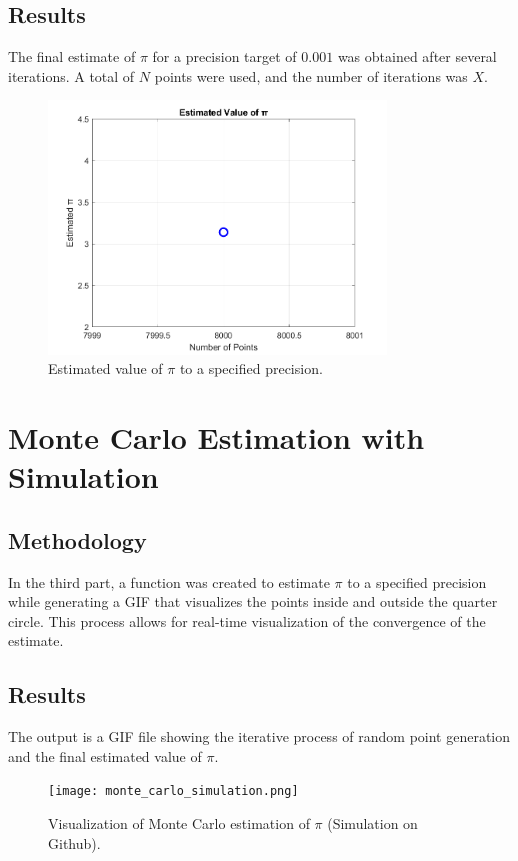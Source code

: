 \documentclass{article}
\begin{document}
\subsection{Results}
The final estimate of $\pi$ for a precision target of $0.001$ was obtained after several iterations. A total of $N$ points were used, and the number of iterations was $X$.

\begin{figure}[h!]
    \centering
    \includegraphics[width=0.8\textwidth]{pi_estimation_precision_plot.png}
    \caption{Estimated value of $\pi$ to a specified precision.}
    \label{fig:precision_estimation}
\end{figure}

\section{Monte Carlo Estimation with Simulation}
\subsection{Methodology}
In the third part, a function was created to estimate $\pi$ to a specified precision while generating a GIF that visualizes the points inside and outside the quarter circle. This process allows for real-time visualization of the convergence of the estimate.

\subsection{Results}
The output is a GIF file showing the iterative process of random point generation and the final estimated value of $\pi$.

\begin{figure}[h!]
    \centering
    \texttt{[image: monte\_carlo\_simulation.png]}
    \caption{Visualization of Monte Carlo estimation of $\pi$ (Simulation on Github).}
    \label{fig:gif_visualization}
\end{figure}
\end{document}

